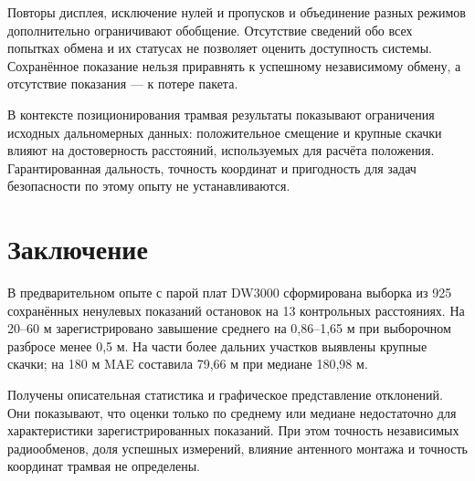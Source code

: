\documentclass{misisarticle}
\begin{document}
Повторы дисплея, исключение нулей и пропусков и объединение разных режимов дополнительно ограничивают обобщение. Отсутствие сведений обо всех попытках обмена и их статусах не позволяет оценить доступность системы. Сохранённое показание нельзя приравнять к успешному независимому обмену, а отсутствие показания --- к потере пакета.

В контексте позиционирования трамвая результаты показывают ограничения исходных дальномерных данных: положительное смещение и крупные скачки влияют на достоверность расстояний, используемых для расчёта положения. Гарантированная дальность, точность координат и пригодность для задач безопасности по этому опыту не устанавливаются.

\section{Заключение}

В предварительном опыте с парой плат DW3000 сформирована выборка из 925 сохранённых ненулевых показаний остановок на 13 контрольных расстояниях. На 20--60 м зарегистрировано завышение среднего на 0,86--1,65 м при выборочном разбросе менее 0,5 м. На части более дальних участков выявлены крупные скачки; на 180 м MAE составила 79,66 м при медиане 180,98 м.

Получены описательная статистика и графическое представление отклонений. Они показывают, что оценки только по среднему или медиане недостаточно для характеристики зарегистрированных показаний. При этом точность независимых радиообменов, доля успешных измерений, влияние антенного монтажа и точность координат трамвая не определены.
\end{document}
